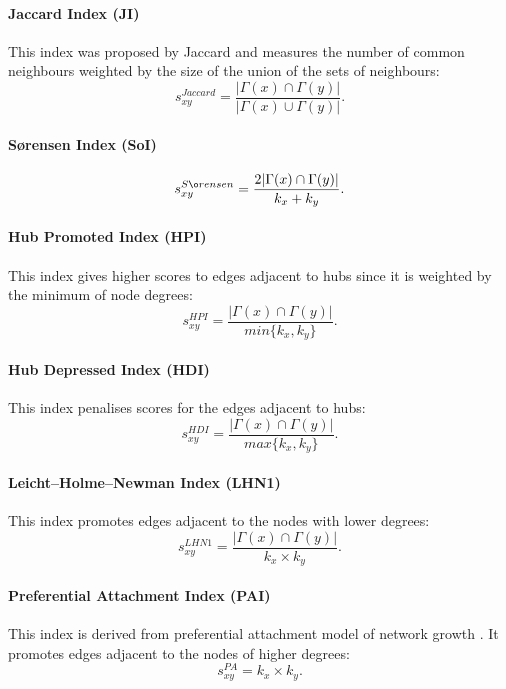 \documentclass{llncs}
\begin{document}
\paragraph{Jaccard Index (JI) \cite{jaccard-index}}
%
This index was proposed by Jaccard and measures the number of common neighbours weighted by the size of the union of the sets of neighbours:
\begin{equation}
s_{xy}^{Jaccard} = \frac{|\Gamma(x) \cap \Gamma(y)|}{|\Gamma(x) \cup \Gamma(y)|}.
\end{equation}
%
\paragraph{S{\o}rensen Index (SoI) \cite{sorensen-index}}
%
\begin{equation}
s_{xy}^{S{\o}rensen} = \frac{2|\Gamma(x) \cap \Gamma(y)|}{k_x + k_y}.
\end{equation}
%
\paragraph{Hub Promoted Index (HPI) \cite{hub-index}}
%
This index gives higher scores to edges adjacent to hubs since it is weighted by the minimum of node degrees:
\begin{equation}
s_{xy}^{HPI} = \frac{|\Gamma(x) \cap \Gamma(y)|}{min\{k_x, k_y\}}.
\end{equation}
%
\paragraph{Hub Depressed Index (HDI)}
%
This index penalises scores for the edges adjacent to hubs:
\begin{equation}
s_{xy}^{HDI} = \frac{|\Gamma(x) \cap \Gamma(y)|}{max\{k_x, k_y\}}.
\end{equation}
%
\paragraph{Leicht–Holme–Newman Index (LHN1) \cite{lhn1-index}}
%
This index promotes edges adjacent to the nodes with lower degrees:
\begin{equation}
s_{xy}^{LHN1} = \frac{|\Gamma(x) \cap \Gamma(y)|}{k_x \times k_y}.
\end{equation}
%
\paragraph{Preferential Attachment Index (PAI)}
%
This index is derived from preferential attachment model of network growth \cite{netw-growth}. It promotes edges adjacent to the nodes of higher degrees:
\begin{equation}
s_{xy}^{PA} = k_x \times k_y.
\end{equation}
%
\end{document}

